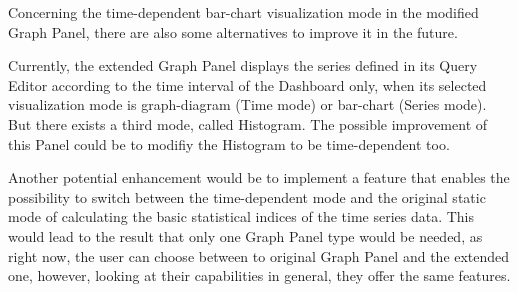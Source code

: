 Concerning the time-dependent bar-chart visualization mode in the modified Graph Panel, there are also some alternatives to improve it in the future.

Currently, the extended Graph Panel displays the series defined in its Query Editor according to the time interval of the Dashboard only, when its selected visualization mode is graph-diagram (Time mode) or bar-chart (Series mode). But there exists a third mode, called Histogram. The possible improvement of this Panel could be to modifiy the Histogram to be time-dependent too.

Another potential enhancement would be to implement a feature that enables the possibility to switch between the time-dependent mode and the original static mode of calculating the basic statistical indices of the time series data. This would lead to the result that only one Graph Panel type would be needed, as right now, the user can choose between to original Graph Panel and the extended one, however, looking at their capabilities in general, they offer the same features.